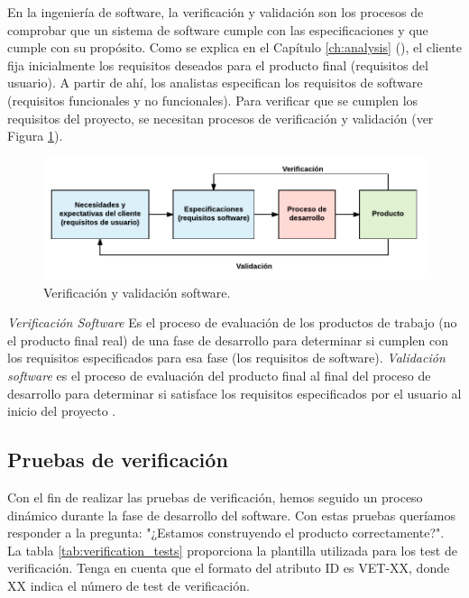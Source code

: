 En la ingeniería de software, la verificación y validación son los procesos de comprobar que un sistema de software cumple con las especificaciones y que cumple con su propósito. Como se explica en el Capítulo \ref{ch:analysis} (\textit{}), el cliente fija inicialmente los requisitos deseados para el producto final (requisitos del usuario). A partir de ahí, los analistas especifican los requisitos de software (requisitos funcionales y no funcionales). Para verificar que se cumplen los requisitos del proyecto, se necesitan procesos de verificación y validación (ver Figura \ref{fig:verification_validation}).

\vspace{1cm}

\begin{figure}[htb]
 	\centering
 	\includegraphics[width=12cm]{figures/verificacion_validacion_diagrama}
 	\caption{Verificación y validación software.}
	\label{fig:verification_validation}
\end{figure}

\vspace{1cm}

\textit{Verificación Software} Es el proceso de evaluación de los productos de trabajo (no el producto final real) de una fase de desarrollo para determinar si cumplen con los requisitos especificados para esa fase (los requisitos de software). \textit{Validación software} es el proceso de evaluación del producto final al final del proceso de desarrollo para determinar si satisface los requisitos especificados por el usuario al inicio del proyecto \cite{verification}.

\subsection{Pruebas de verificación}

Con el fin de realizar las pruebas de verificación, hemos seguido un proceso dinámico durante la fase de desarrollo del software. Con estas pruebas queríamos responder a la pregunta: "¿Estamos construyendo el producto correctamente?". La tabla \ref{tab:verification_tests} proporciona la plantilla utilizada para los test de verificación. Tenga en cuenta que el formato del atributo ID es VET-XX, donde XX indica el número de test de verificación.
\clearpage

